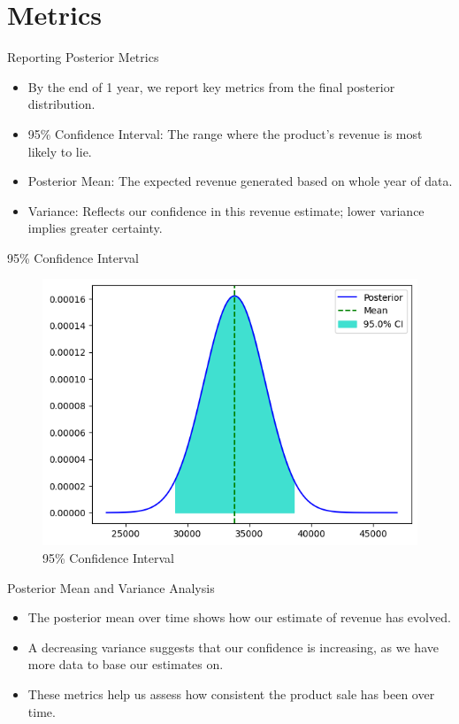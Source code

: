 \section{Metrics}

\begin{frame}{Reporting Posterior Metrics}

  \begin{itemize}
    \item By the end of 1 year, we report key metrics from the final posterior distribution.
    \item 95\% Confidence Interval: The range where the product's revenue is most likely to lie.
    \item Posterior Mean: The expected revenue generated based on whole year of data.
    \item Variance: Reflects our confidence in this revenue estimate; lower variance implies greater certainty.
  \end{itemize}
  
\end{frame}

\begin{frame}{95\% Confidence Interval}

\begin{figure}
  \centering
  \includegraphics[width=.8\linewidth]{../Report/images/ci.png}
  \caption{95\% Confidence Interval}
\end{figure}
  
\end{frame}

\begin{frame}{Posterior Mean and Variance Analysis}

  \begin{itemize}
    \item The posterior mean over time shows how our estimate of revenue has evolved.
    \item A decreasing variance suggests that our confidence is increasing, as we have more data to base our estimates on.
    \item These metrics help us assess how consistent the product sale has been over time.
  \end{itemize}
  
\end{frame}

